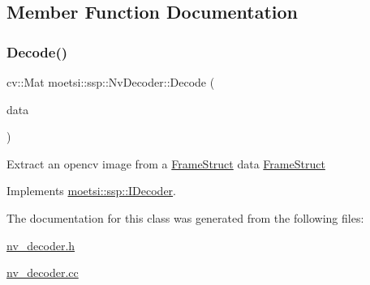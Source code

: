 \subsection{Member Function Documentation}
\mbox{\label{classmoetsi_1_1ssp_1_1NvDecoder_a78eb894b6825ac5ec57f5a4f4ecd7e31}} 
\subsubsection{\texorpdfstring{Decode()}{Decode()}}
{\footnotesize\ttfamily cv\+::\+Mat moetsi\+::ssp\+::\+Nv\+Decoder\+::\+Decode (\begin{DoxyParamCaption}\item[{\hyperlink{structmoetsi_1_1ssp_1_1FrameStruct}{Frame\+Struct} \&}]{data }\end{DoxyParamCaption})\hspace{0.3cm}{\ttfamily [virtual]}}

Extract an opencv image from a \hyperlink{structmoetsi_1_1ssp_1_1FrameStruct}{Frame\+Struct}  data \hyperlink{structmoetsi_1_1ssp_1_1FrameStruct}{Frame\+Struct} 

Implements \hyperlink{classmoetsi_1_1ssp_1_1IDecoder_a1c06604dc4107d3668a4e791c13cc063}{moetsi\+::ssp\+::\+I\+Decoder}.



The documentation for this class was generated from the following files\+:\begin{DoxyCompactItemize}
\item 
\hyperlink{nv__decoder_8h}{nv\+\_\+decoder.\+h}\item 
\hyperlink{nv__decoder_8cc}{nv\+\_\+decoder.\+cc}\end{DoxyCompactItemize}
